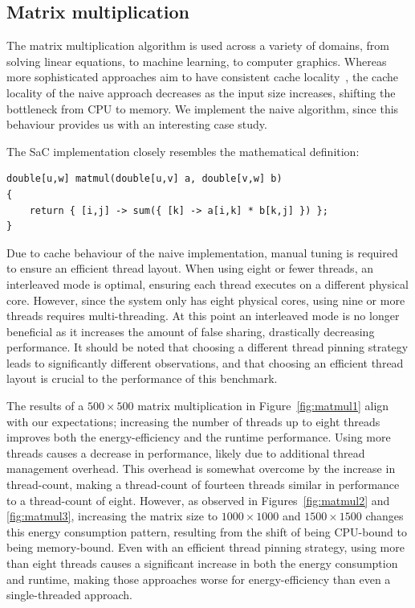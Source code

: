 \subsection{Matrix multiplication}
The matrix multiplication algorithm is used across a variety of domains, from solving linear
equations, to machine learning, to computer graphics. Whereas more sophisticated approaches aim to
have consistent cache locality~\cite{sac-blocking}, the cache locality of the naive approach
decreases as the input size increases, shifting the bottleneck from CPU to memory. We implement the
naive algorithm, since this behaviour provides us with an interesting case study.

The SaC implementation closely resembles the mathematical definition:
\begin{verbatim}
double[u,w] matmul(double[u,v] a, double[v,w] b)
{
    return { [i,j] -> sum({ [k] -> a[i,k] * b[k,j] }) };
}
\end{verbatim}

Due to cache behaviour of the naive implementation, manual tuning is required to ensure an efficient
thread layout. When using eight or fewer threads, an interleaved mode is optimal, ensuring each
thread executes on a different physical core. However, since the system only has eight physical
cores, using nine or more threads requires multi-threading. At this point an interleaved mode is no
longer beneficial as it increases the amount of false sharing, drastically decreasing performance.
It should be noted that choosing a different thread pinning strategy leads to significantly
different observations, and that choosing an efficient thread layout is crucial to the performance
of this benchmark.

The results of a $500 \times 500$ matrix multiplication in Figure~\ref{fig:matmul1} align with our
expectations; increasing the number of threads up to eight threads improves both the
energy-efficiency and the runtime performance. Using more threads causes a decrease in performance,
likely due to additional thread management overhead. This overhead is somewhat overcome by the
increase in thread-count, making a thread-count of fourteen threads similar in performance to a
thread-count of eight. However, as observed in Figures~\ref{fig:matmul2} and \ref{fig:matmul3},
increasing the matrix size to $1000 \times 1000$ and $1500 \times 1500$ changes this energy
consumption pattern, resulting from the shift of being CPU-bound to being memory-bound. Even with an
efficient thread pinning strategy, using more than eight threads causes a significant increase in
both the energy consumption and runtime, making those approaches worse for energy-efficiency than
even a single-threaded approach.


